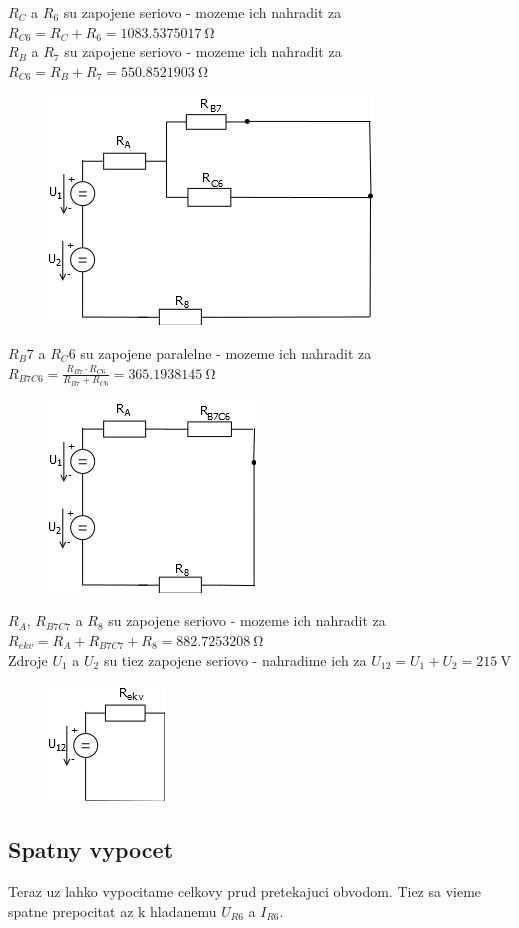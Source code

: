 $R_C$ a $R_{6}$ su zapojene seriovo - mozeme ich nahradit za $R_{C6} = R_C + R_{6} = \SI{1083.5375017}{\ohm}$\\
$R_B$ a $R_{7}$ su zapojene seriovo - mozeme ich nahradit za $R_{C6} = R_B + R_{7} = \SI{550.8521903}{\ohm}$
\begin{figure}[!h]
    \centering
    \includegraphics[width=0.5\linewidth]{pr1/5.png}
\end{figure}

$R_B7$ a $R_C6$ su zapojene paralelne - mozeme ich nahradit za $R_{B7C6} = \frac{R_{B7} \cdot R_{C6}}{R_{B7} + R_{C6}} = \SI{365.1938145}{\ohm}$
\begin{figure}[!h]
    \centering
    \includegraphics[width=0.2\linewidth]{pr1/6.png}
\end{figure}
\newpage

$R_A$, $R_{B7C7}$ a $R_{8}$ su zapojene seriovo - mozeme ich nahradit za \\
$R_{ekv} = R_A + R_{B7C7} + R_{8} = \SI{882.7253208}{\ohm}$\\
Zdroje $U_1$ a $U_2$ su tiez zapojene seriovo - nahradime ich za $U_{12} = U_1 + U_2 = \SI{215}{\volt}$
\begin{figure}[!h]
    \centering
    \includegraphics[width=0.2\linewidth]{pr1/7.png}
\end{figure}

\subsection{Spatny vypocet}
Teraz uz lahko vypocitame celkovy prud pretekajuci obvodom. Tiez sa vieme spatne prepocitat az k hladanemu $U_{R6}$ a $I_{R6}$.

